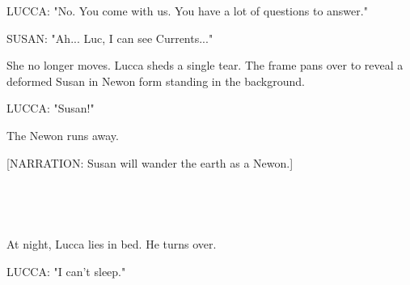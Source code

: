 \documentclass[11pt]{article}
\begin{document}
LUCCA: "No. You come with us. 
You have a lot of questions to answer."

SUSAN: "Ah... Luc, I can see Currents..."

She no longer moves.
Lucca sheds a single tear.
The frame pans over to reveal a deformed Susan in Newon form standing in the background.

LUCCA: "Susan!"

The Newon runs away.

[NARRATION: Susan will wander the earth as a Newon.]

\ 

\ 

At night, Lucca lies in bed.
He turns over.

LUCCA: "I can't sleep."
\end{document}
